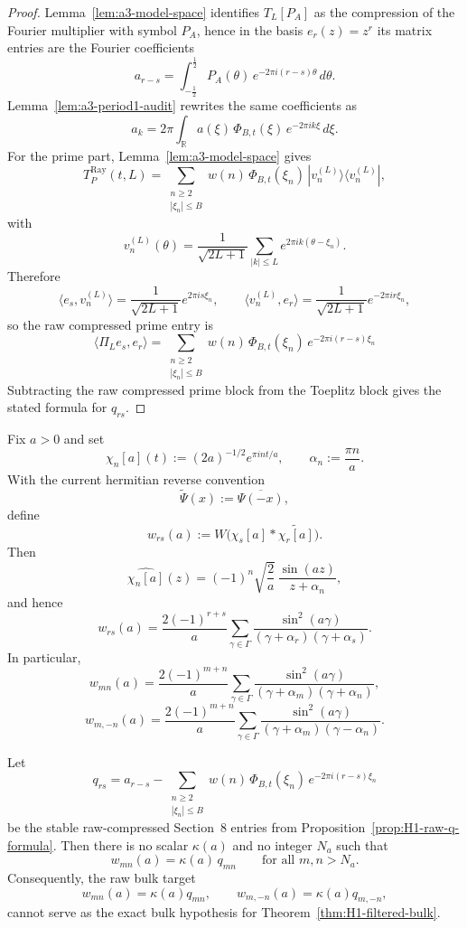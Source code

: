 \begin{proof}
Lemma~\ref{lem:a3-model-space} identifies $T_L[P_A]$ as the compression of the
Fourier multiplier with symbol $P_A$, hence in the basis $e_r(z)=z^r$ its
matrix entries are the Fourier coefficients
\[
  a_{r-s}
  =
  \int_{-\tfrac12}^{\tfrac12} P_A(\theta)\,e^{-2\pi i(r-s)\theta}\,d\theta.
\]
Lemma~\ref{lem:a3-period1-audit} rewrites the same coefficients as
\[
  a_k
  =
  2\pi\int_{\mathbb R} a(\xi)\,\Phi_{B,t}(\xi)\,e^{-2\pi i k\xi}\,d\xi.
\]
For the prime part, Lemma~\ref{lem:a3-model-space} gives
\[
  T_P^{\mathrm{Ray}}(t,L)
  =
  \sum_{\substack{n\ge2\\ |\xi_n|\le B}}
  w(n)\,\Phi_{B,t}(\xi_n)\,|v_n^{(L)}\rangle\!\langle v_n^{(L)}|,
\]
with
\[
  v_n^{(L)}(\theta)=\frac{1}{\sqrt{2L+1}}
  \sum_{|k|\le L}e^{2\pi i k(\theta-\xi_n)}.
\]
Therefore
\[
  \langle e_s,v_n^{(L)}\rangle
  =
  \frac{1}{\sqrt{2L+1}}e^{2\pi i s\xi_n},
  \qquad
  \langle v_n^{(L)},e_r\rangle
  =
  \frac{1}{\sqrt{2L+1}}e^{-2\pi i r\xi_n},
\]
so the raw compressed prime entry is
\[
  \langle \Pi_L e_s,e_r\rangle
  =
  \sum_{\substack{n\ge2\\ |\xi_n|\le B}}
  w(n)\,\Phi_{B,t}(\xi_n)\,e^{-2\pi i(r-s)\xi_n}
\]
Subtracting the raw compressed prime block from the Toeplitz block gives the
stated formula for $q_{rs}$.
\end{proof}

\begin{lemma}\label{lem:H1-raw-suzuki-entries}
Fix $a>0$ and set
\[
  \chi_n[a](t):=(2a)^{-1/2}e^{\pi i n t/a},
  \qquad
  \alpha_n:=\frac{\pi n}{a}.
\]
With the current hermitian reverse convention
\[
  \widetilde{\Psi}(x):=\overline{\Psi(-x)},
\]
define
\[
  w_{rs}(a):=W\bigl(\chi_s[a]*\widetilde{\chi_r[a]}\bigr).
\]
Then
\[
  \widehat{\chi_n[a]}(z)=(-1)^n\sqrt{\frac2a}\,\frac{\sin(az)}{z+\alpha_n},
\]
and hence
\[
  w_{rs}(a)
  =
  \frac{2(-1)^{r+s}}{a}
  \sum_{\gamma\in\Gamma}
  \frac{\sin^2(a\gamma)}
  {(\gamma+\alpha_r)(\gamma+\alpha_s)}.
\]
In particular,
\[
  w_{mn}(a)
  =
  \frac{2(-1)^{m+n}}{a}
  \sum_{\gamma\in\Gamma}
  \frac{\sin^2(a\gamma)}
  {(\gamma+\alpha_m)(\gamma+\alpha_n)},
\]
\[
  w_{m,-n}(a)
  =
  \frac{2(-1)^{m+n}}{a}
  \sum_{\gamma\in\Gamma}
  \frac{\sin^2(a\gamma)}
  {(\gamma+\alpha_m)(\gamma-\alpha_n)}.
\]
\end{lemma}

\begin{proposition}\label{prop:H1-raw-bulk-mismatch}
Let
\[
  q_{rs}
  =
  a_{r-s}
  -
  \sum_{\substack{n\ge2\\ |\xi_n|\le B}}
  w(n)\,\Phi_{B,t}(\xi_n)\,e^{-2\pi i(r-s)\xi_n}
\]
be the stable raw-compressed Section~8 entries from
Proposition~\ref{prop:H1-raw-q-formula}. Then there is no scalar $\kappa(a)$
and no integer $N_a$ such that
\[
  w_{mn}(a)=\kappa(a)\,q_{mn}
  \qquad\text{for all }m,n>N_a.
\]
Consequently, the raw bulk target
\[
  w_{mn}(a)=\kappa(a)q_{mn},
  \qquad
  w_{m,-n}(a)=\kappa(a)q_{m,-n},
\]
cannot serve as the exact bulk hypothesis for Theorem~\ref{thm:H1-filtered-bulk}.
\end{proposition}

